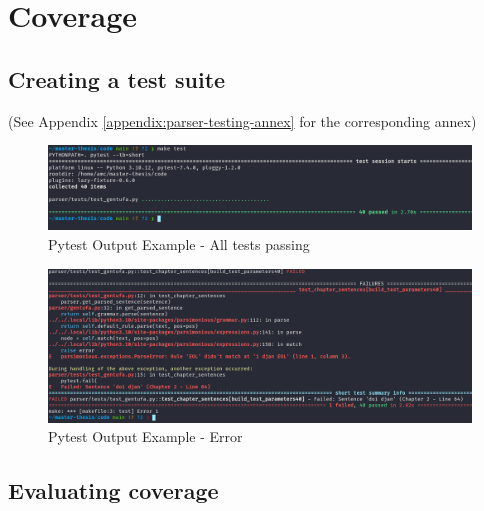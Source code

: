 \chapter{Coverage}

\section{Creating a test suite}
\label{sub:creating_a_test_suite}

(See Appendix \ref{appendix:parser-testing-annex} for the corresponding annex)

\begin{figure}[H]
\hspace{-1.1cm}
\includegraphics[scale=0.43]{images/pytest_output_pass.png}
\caption{Pytest Output Example - All tests passing}
\end{figure}

\begin{figure}[H]
\hspace{-2.2cm}
\includegraphics[scale=0.43]{images/pytest_output_fail.png}
\caption{Pytest Output Example - Error}
\end{figure}

\section{Evaluating coverage}